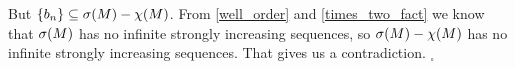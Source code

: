 But $\{b_n\} \subseteq {{\sigma}(M)} - \chi(M)$. 
From \ref{well_order} and \ref{times_two_fact} we know that ${{\sigma}(M)}$ has no infinite 
strongly increasing sequences, so 
${{\sigma}(M)} - \chi(M)$ has no infinite strongly increasing sequences. That gives us a 
contradiction.
$_\square$ 



 
